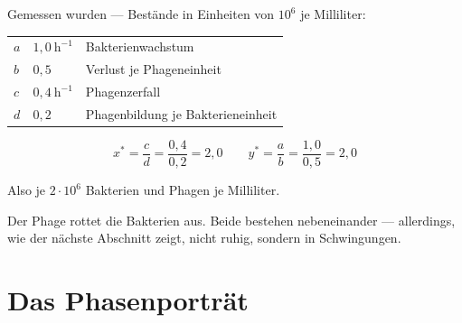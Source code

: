 \begin{merksatz}
Gemessen wurden --- Bestände in Einheiten von $10^6$ je Milliliter:
\begin{center}
\renewcommand{\arraystretch}{1.45}
\begin{tabular}{@{}P{1.4cm}P{2.0cm}P{4.2cm}@{}}
\toprule
$a$ & $1{,}0\ \mathrm{h}^{-1}$ & Bakterienwachstum\\
$b$ & $0{,}5$ & Verlust je Phageneinheit\\
$c$ & $0{,}4\ \mathrm{h}^{-1}$ & Phagenzerfall\\
$d$ & $0{,}2$ & Phagenbildung je Bakterieneinheit\\
\bottomrule
\end{tabular}
\end{center}

\[ x^{*} = \frac{c}{d} = \frac{0{,}4}{0{,}2} = 2{,}0 \qquad y^{*} = \frac{a}{b} = \frac{1{,}0}{0{,}5} = 2{,}0 \]

Also je $2\cdot10^6$ Bakterien und Phagen je Milliliter.

Der Phage rottet die Bakterien  aus. Beide bestehen nebeneinander --- allerdings, wie der nächste Abschnitt zeigt, nicht ruhig, sondern in Schwingungen.
\end{merksatz}

\section{Das Phasenporträt}

